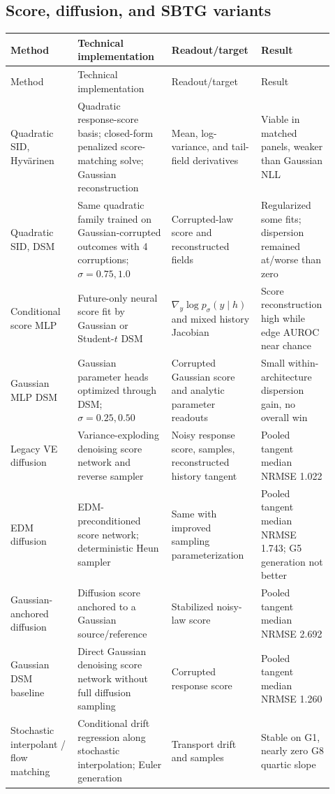 \documentclass[10pt]{article}
\begin{document}
\subsection{Score, diffusion, and SBTG variants}

\begin{longtable}{L{0.20\linewidth}L{0.28\linewidth}L{0.24\linewidth}L{0.20\linewidth}}
\toprule
Method & Technical implementation & Readout/target & Result \\
\midrule
\endfirsthead
\toprule Method & Technical implementation & Readout/target & Result \\
\midrule\endhead
Quadratic SID, Hyv\"arinen & Quadratic response-score basis; closed-form penalized score-matching solve; Gaussian reconstruction & Mean, log-variance, and tail-field derivatives & Viable in matched panels, weaker than Gaussian NLL \\
Quadratic SID, DSM & Same quadratic family trained on Gaussian-corrupted outcomes with 4 corruptions; $\sigma=0.75,1.0$ & Corrupted-law score and reconstructed fields & Regularized some fits; dispersion remained at/worse than zero \\
Conditional score MLP & Future-only neural score fit by Gaussian or Student-$t$ DSM & $\nabla_y\log p_\sigma(y\mid h)$ and mixed history Jacobian & Score reconstruction high while edge AUROC near chance \\
Gaussian MLP DSM & Gaussian parameter heads optimized through DSM; $\sigma=0.25,0.50$ & Corrupted Gaussian score and analytic parameter readouts & Small within-architecture dispersion gain, no overall win \\
Legacy VE diffusion & Variance-exploding denoising score network and reverse sampler & Noisy response score, samples, reconstructed history tangent & Pooled tangent median NRMSE 1.022 \\
EDM diffusion & EDM-preconditioned score network; deterministic Heun sampler & Same with improved sampling parameterization & Pooled tangent median NRMSE 1.743; G5 generation not better \\
Gaussian-anchored diffusion & Diffusion score anchored to a Gaussian source/reference & Stabilized noisy-law score & Pooled tangent median NRMSE 2.692 \\
Gaussian DSM baseline & Direct Gaussian denoising score network without full diffusion sampling & Corrupted response score & Pooled tangent median NRMSE 1.260 \\
Stochastic interpolant / flow matching & Conditional drift regression along stochastic interpolation; Euler generation & Transport drift and samples & Stable on G1, nearly zero G8 quartic slope \\

\end{longtable}
\end{document}
